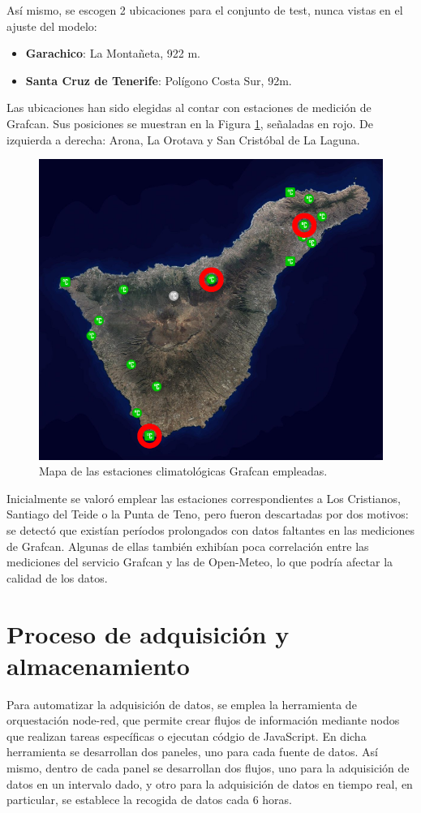 Así mismo, se escogen 2 ubicaciones para el conjunto de test, nunca vistas en el ajuste del modelo:
\begin{itemize}
    \item \textbf{Garachico}: La Montañeta, 922 m.
    \item \textbf{Santa Cruz de Tenerife}: Polígono Costa Sur, 92m.
\end{itemize}

Las ubicaciones han sido elegidas al contar con estaciones de medición de Grafcan.
Sus posiciones se muestran en la Figura \ref{mapa_estaciones}, señaladas en rojo. De izquierda a derecha: Arona, La Orotava y San Cristóbal de La Laguna.

\begin{figure}[htb]
   \centering
   \includegraphics[width=0.6\linewidth]{images/mapa_estaciones}
   \caption{Mapa de las estaciones climatológicas Grafcan empleadas.}
   \label{mapa_estaciones}
\end{figure}

Inicialmente se valoró emplear las estaciones correspondientes a Los Cristianos, Santiago del Teide o la Punta de Teno, pero fueron descartadas por dos motivos: 
se detectó que existían períodos prolongados con datos faltantes en las mediciones de Grafcan. Algunas de ellas también exhibían poca correlación entre las mediciones
del servicio Grafcan y las de Open-Meteo, lo que podría afectar la calidad de los datos.

\bigskip

\section{Proceso de adquisición y almacenamiento}

Para automatizar la adquisición de datos, se emplea la herramienta de orquestación node-red, que permite crear flujos de información mediante nodos que realizan tareas específicas o ejecutan códgio de JavaScript.
En dicha herramienta se desarrollan dos paneles, uno para cada fuente de datos. 
Así mismo, dentro de cada panel se desarrollan dos flujos, uno para la adquisición de datos en un intervalo dado, y otro para la adquisición de datos en tiempo real, en particular, 
se establece la recogida de datos cada 6 horas.

